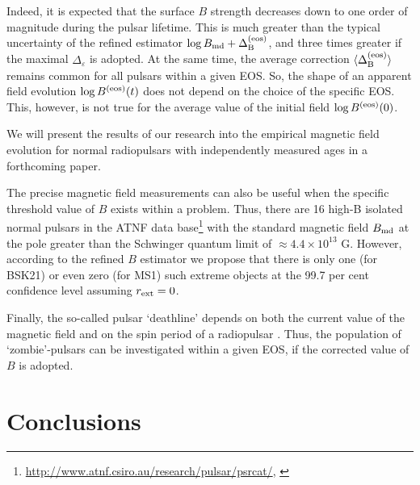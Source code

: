 \documentclass[fleqn,usenatbib]{mnras}
\begin{document}
Indeed, it is expected that the surface $B$ strength decreases
down to one order of magnitude during the pulsar lifetime. This
is much greater than the typical uncertainty of the refined estimator $\log B_{\rm md} + \Delta^{\rm (eos)}_{\rm B}$, and three times greater if the maximal
$\Delta_{\varepsilon}$ is adopted. At the same time, the average correction $\langle \Delta^{\rm 
(eos)}_{\rm B}\rangle$ remains
common for all pulsars within a given EOS. So, the shape of an apparent field evolution $\log B^{\rm (eos)}(t)$ does not depend on the choice
of the specific EOS. This, however, is not true for the average value
of the initial field $\log
B^{\rm (eos)}(0)$.

We will present the results of our research into the empirical
magnetic field evolution for normal radiopulsars with independently
measured ages in a forthcoming paper.

The precise magnetic field measurements can also be useful when
the specific threshold value of $B$ exists within a problem. Thus,
there are 16 high-B isolated normal pulsars in the ATNF data base\footnote{\url{http://www.atnf.csiro.au/research/pulsar/psrcat/},
\cite{atnf}}
with the standard magnetic field $B_{\rm md}$ at the pole greater than the
Schwinger quantum limit of $\approx 4.4\times
10^{13}$ G. However, according to
the refined $B$ estimator we propose that there is only one (for BSK21)
or even zero (for MS1) such extreme objects at the 99.7 per cent
confidence level assuming $r_{\rm ext} = 0$.

Finally, the so-called pulsar `deathline' depends on both the current value of the magnetic field and on the spin period of a radiopulsar \citep[e.g][]{rs75, chenrud93, kantor04}. Thus, the population of `zombie'-pulsars
can be investigated within a given EOS, if the corrected value of $B$
is adopted.

\section{Conclusions}
\label{sect:conclude}
\end{document}
